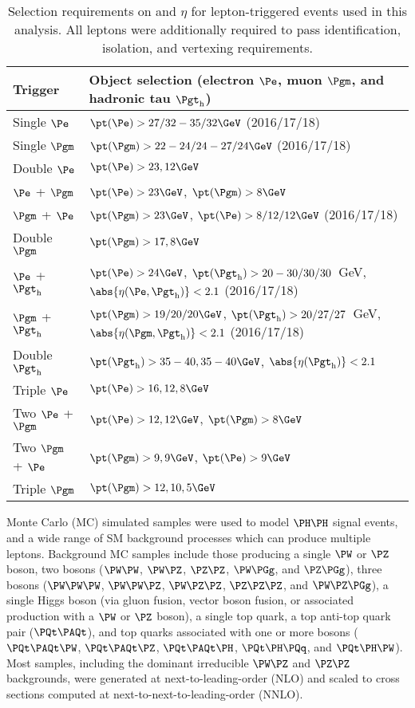 \begin{table}[!h]
\begin{center}
\begin{tabular}{|l|l|}

\hline
Trigger            & Object selection (electron $\Pe$, muon $\Pgm$, and hadronic tau $\tauh$) \\
\hline
Single $\Pe$       & $\pt(\Pe) > 27 / 32 - 35 / 32\GeV$ (2016/17/18) \\
Single $\Pgm$      & $\pt(\Pgm) > 22 - 24 / 24 - 27 / 24\GeV$ (2016/17/18) \\ 
Double $\Pe$       & $\pt(\Pe) > 23, 12\GeV$ \\
$\Pe$ + $\Pgm$     & $\pt(\Pe) > 23\GeV$, $\pt(\Pgm) > 8\GeV$ \\
$\Pgm$ + $\Pe$     & $\pt(\Pgm) > 23\GeV$, $\pt(\Pe) > 8 / 12 / 12\GeV$ (2016/17/18) \\
Double $\Pgm$      & $\pt(\Pgm) > 17, 8\GeV$ \\
$\Pe$ + $\tauh$    & $\pt(\Pe) > 24\GeV$, $\pt(\tauh) > 20 - 30 / 30 / 30$~GeV, $\abs{\eta(\Pe, \tauh)} < 2.1$ (2016/17/18) \\
$\Pgm$ + $\tauh$   & $\pt(\Pgm) > 19 / 20 / 20\GeV$, $\pt(\tauh) > 20 / 27 / 27$~GeV, $\abs{\eta(\Pgm, \tauh)} < 2.1$ (2016/17/18) \\
Double $\tauh$     & $\pt(\tauh) > 35 - 40, 35 - 40\GeV$, $\abs{\eta(\tauh)} < 2.1$  \\
Triple $\Pe$       & $\pt(\Pe) > 16, 12, 8\GeV$ \\
Two $\Pe$ + $\Pgm$ & $\pt(\Pe) > 12, 12\GeV$, $\pt(\Pgm) > 8\GeV$ \\
Two $\Pgm$ + $\Pe$ & $\pt(\Pgm) > 9, 9\GeV$, $\pt(\Pe) > 9\GeV$ \\
Triple $\Pgm$      & $\pt(\Pgm) > 12, 10, 5\GeV$ \\
\hline

\end{tabular}
\end{center}
\caption{
  Selection requirements on \pt and $\eta$ for lepton-triggered events used in this analysis.  All
  leptons were additionally required to pass identification, isolation, and vertexing requirements.
}
\label{tab:triggers}
\end{table}


Monte Carlo (MC) simulated samples were used to model $\PHiggs\PHiggs$ signal events, and a wide range
of SM background processes which can produce multiple leptons.  Background MC samples
include those producing a single $\PW$ or $\PZ$ boson, two bosons ($\PW\PW$, $\PW\PZ$, $\PZ\PZ$, $\PW\Pgg$, and $\PZ\Pgg$),
three bosons ($\PW\PW\PW$, $\PW\PW\PZ$, $\PW\PZ\PZ$, $\PZ\PZ\PZ$, and $\PW\PZ\Pgg$), a single Higgs boson (via gluon fusion,
vector boson fusion, or associated production with a $\PW$ or $\PZ$ boson), a single top quark,
a top anti-top quark pair ($\ttbar$), and top quarks associated with one or more bosons ($\ttW$,
$\ttZ$, $\ttH$, $\tHq$, and $\tHW$).  Most samples, including the dominant irreducible $\PW\PZ$ and $\PZ\PZ$
backgrounds, were generated at next-to-leading-order (NLO) and scaled to cross sections
computed at next-to-next-to-leading-order (NNLO).

